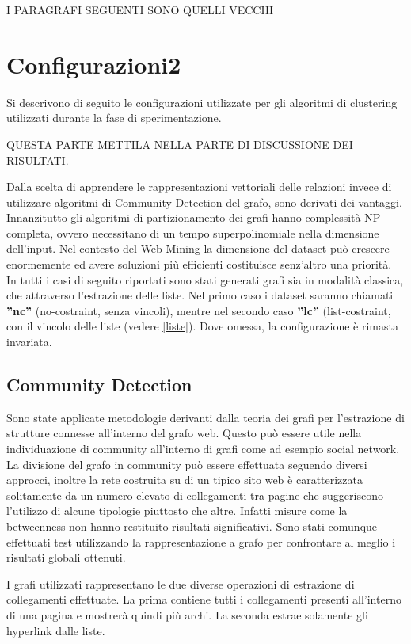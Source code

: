 \color{red}
I PARAGRAFI SEGUENTI SONO QUELLI VECCHI

\section{Configurazioni2}
Si descrivono di seguito le configurazioni utilizzate per gli algoritmi di clustering utilizzati durante la fase di sperimentazione. 
\color{red}

QUESTA PARTE METTILA NELLA PARTE DI DISCUSSIONE DEI RISULTATI.

Dalla scelta di apprendere le rappresentazioni vettoriali delle relazioni invece di utilizzare algoritmi di Community Detection del grafo, sono derivati dei vantaggi. Innanzitutto gli algoritmi di partizionamento dei grafi hanno complessità NP-completa, ovvero necessitano di un tempo superpolinomiale nella dimensione dell'input. Nel contesto del Web Mining la dimensione del dataset può crescere enormemente ed avere soluzioni più efficienti costituisce senz'altro una priorità. 
\\
In tutti i casi di seguito riportati sono stati generati grafi sia in modalità classica, che attraverso l'estrazione delle liste. Nel primo caso i dataset saranno chiamati \textbf{''nc''} (no-costraint, senza vincoli), mentre nel secondo caso \textbf{''lc''} (list-costraint, con il vincolo delle liste (vedere \ref{liste}). Dove omessa, la configurazione è rimasta invariata.
\color{black}
\subsection{Community Detection}
Sono state applicate metodologie derivanti dalla teoria dei grafi per l'estrazione di strutture connesse all'interno del grafo web. Questo può essere utile nella individuazione di community all'interno di grafi come ad esempio social network. La divisione del grafo in community può essere effettuata seguendo diversi approcci, inoltre la rete costruita su di un tipico sito web è caratterizzata solitamente da un numero elevato di collegamenti tra pagine che suggeriscono l'utilizzo di alcune tipologie piuttosto che altre. Infatti misure come la betweenness non hanno restituito risultati significativi.
Sono stati comunque effettuati test utilizzando la rappresentazione a grafo per confrontare al meglio i risultati globali ottenuti.


I grafi utilizzati rappresentano le due diverse operazioni di estrazione di collegamenti effettuate. La prima contiene tutti i collegamenti presenti all'interno di una pagina e mostrerà quindi più archi. La seconda estrae solamente gli hyperlink dalle liste.

